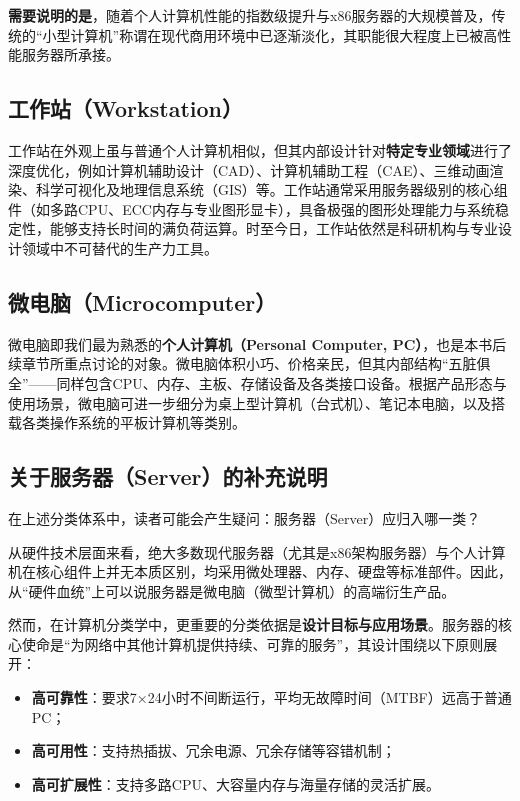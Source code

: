 \documentclass[12pt,UTF8]{ctexbook}
\begin{document}
\textbf{需要说明的是}，随着个人计算机性能的指数级提升与x86服务器的大规模普及，传统的“小型计算机”称谓在现代商用环境中已逐渐淡化，其职能很大程度上已被高性能服务器所承接。

\subsection{工作站（Workstation）}

工作站在外观上虽与普通个人计算机相似，但其内部设计针对\textbf{特定专业领域}进行了深度优化，例如计算机辅助设计（CAD）、计算机辅助工程（CAE）、三维动画渲染、科学可视化及地理信息系统（GIS）等。工作站通常采用服务器级别的核心组件（如多路CPU、ECC内存与专业图形显卡），具备极强的图形处理能力与系统稳定性，能够支持长时间的满负荷运算。时至今日，工作站依然是科研机构与专业设计领域中不可替代的生产力工具。

\subsection{微电脑（Microcomputer）}

微电脑即我们最为熟悉的\textbf{个人计算机（Personal Computer, PC）}，也是本书后续章节所重点讨论的对象。微电脑体积小巧、价格亲民，但其内部结构“五脏俱全”——同样包含CPU、内存、主板、存储设备及各类接口设备。根据产品形态与使用场景，微电脑可进一步细分为桌上型计算机（台式机）、笔记本电脑，以及搭载各类操作系统的平板计算机等类别。

\subsection{关于服务器（Server）的补充说明}

在上述分类体系中，读者可能会产生疑问：服务器（Server）应归入哪一类？

从硬件技术层面来看，绝大多数现代服务器（尤其是x86架构服务器）与个人计算机在核心组件上并无本质区别，均采用微处理器、内存、硬盘等标准部件。因此，从“硬件血统”上可以说服务器是微电脑（微型计算机）的高端衍生产品。

然而，在计算机分类学中，更重要的分类依据是\textbf{设计目标与应用场景}。服务器的核心使命是“为网络中其他计算机提供持续、可靠的服务”，其设计围绕以下原则展开：

\begin{itemize}
\item \textbf{高可靠性}：要求7×24小时不间断运行，平均无故障时间（MTBF）远高于普通PC；
\item \textbf{高可用性}：支持热插拔、冗余电源、冗余存储等容错机制；
\item \textbf{高可扩展性}：支持多路CPU、大容量内存与海量存储的灵活扩展。
\end{itemize}
\end{document}
